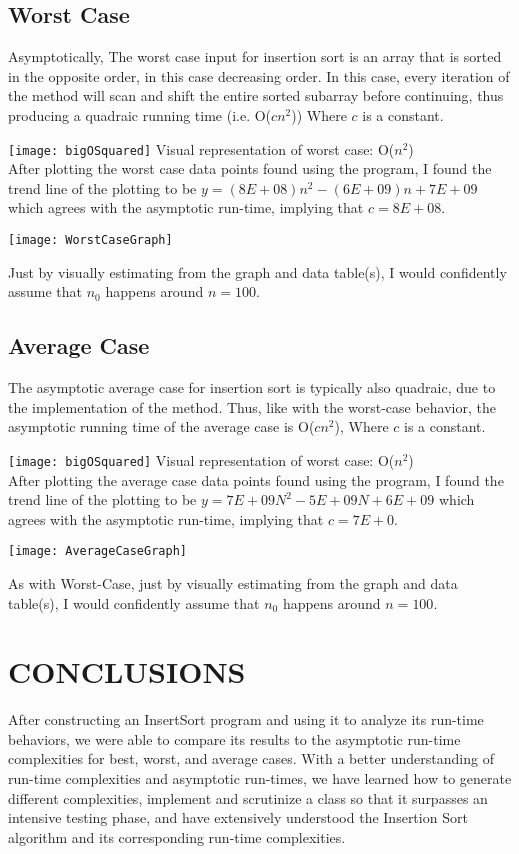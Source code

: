 \documentclass[12pt]{article}
\begin{document}
\subsection*{Worst Case}
Asymptotically, The worst case input for insertion sort is an array that is sorted in the opposite order, in this case decreasing order. In this case, every iteration of the method will scan and shift the entire sorted subarray before continuing, thus producing a quadraic running time (i.e. O($cn^2$)) Where $c$ is a constant.

\texttt{[image: bigOSquared]}
Visual representation of worst case: O($n^2$)\\

After plotting the worst case data points found using the program, I found the trend line of the plotting to be $y=(8E+08)n^2 -(6E+09)n+7E+09$ which agrees with the asymptotic run-time, implying that $c = 8E+08$. 

\texttt{[image: WorstCaseGraph]}

Just by visually estimating from the graph and data table(s), I would confidently assume that $n_0$ happens around $n = 100$.

\subsection*{Average Case}
The asymptotic average case for insertion sort is typically also quadraic, due to the implementation of the method. Thus, like with the worst-case behavior, the asymptotic running time of the  average case is O($cn^2$), Where $c$ is a constant.

\texttt{[image: bigOSquared]}
Visual representation of worst case: O($n^2$)\\

After plotting the average case data points found using the program, I found the trend line of the plotting to be $y=7E+09N^2 - 5E+09N + 6E+09$ which agrees with the asymptotic run-time, implying that $c = 7E+0$. 

\texttt{[image: AverageCaseGraph]}

As with Worst-Case, just by visually estimating from the graph and data table(s), I would confidently assume that $n_0$ happens around $n = 100$.

\section*{CONCLUSIONS}

After constructing an InsertSort program and using it to analyze its run-time behaviors, we were able to compare its results to the asymptotic run-time complexities for best, worst, and average cases. With a better understanding of run-time complexities and asymptotic run-times, we have learned how to generate different complexities, implement and scrutinize a class so that it surpasses an intensive testing phase, and have extensively understood the Insertion Sort algorithm and its corresponding run-time complexities.
\pagebreak
\end{document}
